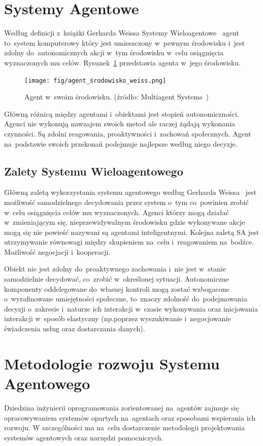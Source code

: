 \documentclass[11pt]{report}
\begin{document}
    \section{Systemy Agentowe}\label{sec:systemy-agentowe}
    Według definicji z~książki Gerharda Weissa Systemy Wieloagentowe~\cite{55066420130101} agent to~system komputerowy który jest umieszczony w~pewnym środowisku i~jest zdolny do~autonomicznych akcji w~tym środowisku w~celu osiągnięcia wyznaczonych mu celów.
    Rysunek~\ref{fig:agent} przedstawia agenta w~jego środowisku.

    \begin{figure}[tp]
        \centering
        \texttt{[image: fig/agent\_środowisko\_weiss.png]}
        \caption{Agent w~swoim środowisku. (źródło: Multiagent Systems~\cite{55066420130101})}
        \label{fig:agent}
    \end{figure}

    Główną różnicą między agentami i~obiektami jest stopień autonomiczności.
    Agenci nie wykonują nawzajem swoich metod ale raczej żądają wykonania czynności.
    Są zdolni reagowania, proaktywności i~zachowań społecznych.
    Agent na~podstawie swoich przekonań podejmuje najlepsze według niego decyzje.

    \subsection{Zalety Systemu Wieloagentowego}
    Główną zaletą wykorzystania systemu agentowego według Gerharda Weissa~\cite{55066420130101} jest możliwość samodzielnego decydowania przez system o~tym co~powinien zrobić w~celu osiągnięcia celów mu wyznaczonych.
    Agenci którzy mogą działać w~zmieniającym się, nieprzewidywalnym środowisku gdzie wykonywane akcje mogą się nie powieść nazywani są agentami inteligentnymi.
    Kolejna zaletą SA jest utrzymywanie równowagi między skupieniem na~celu i~reagowaniem na~bodźce.
    Możliwość negocjacji i~kooperacji.

    Obiekt nie jest zdolny do~proaktywnego zachowania i~nie jest w~stanie samodzielnie decydować, co~zrobić w~określonej sytuacji.
    Autonomiczne komponenty oddelegowane do~własnej kontroli mogą zostać wzbogacone o~wyrafinowane umiejętności społeczne, to~znaczy zdolność do~podejmowania decyzji o~zakresie i~naturze ich interakcji w~czasie wykonywania oraz inicjowania interakcji w~sposób elastyczny (np.\@ poprzez wyszukiwanie i~negocjowanie świadczenia usług oraz dostarczania danych).


    \section{Metodologie rozwoju Systemu Agentowego}\label{sec:metodologie-rozwoju-systemu-agentowego}
    Dziedzina inżynierii oprogramowania zorientowanej na~agentów zajmuje się opracowywaniem systemów opartych na~agentach oraz sposobami wspierania ich rozwoju.
    W szczególności ma na~celu dostarczenie metodologii projektowania systemów agentowych oraz narzędzi pomocniczych.
\end{document}
